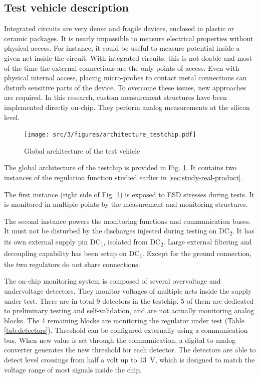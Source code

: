 \subsection{Test vehicle description}
\label{sec:test-vehicle-desc}

Integrated circuits are very dense and fragile devices, enclosed in plastic or ceramic packages.
It is nearly impossible to measure electrical properties without physical access.
For instance, it could be useful to measure potential inside a given net inside the circuit.
With integrated circuits, this is not doable and most of the time the external connections are the only points of access.
Even with physical internal access, placing micro-probes to contact metal connections can disturb sensitive parts of the device.
To overcome these issues, new approaches are required.
In this research, custom measurement structures have been implemented directly on-chip.
They perform analog measurements at the silicon level.

\begin{figure}[h]
  \centering
  \texttt{[image: src/3/figures/architecture\_testchip.pdf]}
  \caption{Global architecture of the test vehicle}
  \label{architecture_testchip}
\end{figure}

The global architecture of the testchip is provided in Fig. \ref{architecture_testchip}.
It contains two instances of the regulation function studied earlier in \ref{sec:study-real-product}.

The first instance (right side of Fig. \ref{architecture_testchip}) is exposed to \gls{ESD} stresses during tests.
It is monitored in multiple points by the measurement and monitoring structures.

The second instance powers the monitoring functions and communication buses.
It must not be disturbed by the discharges injected during testing on DC\textsubscript{2}.
It has its own external supply pin DC\textsubscript{1}, isolated from DC\textsubscript{2}.
Large external filtering and decoupling capability has been setup on DC\textsubscript{1}.
Except for the ground connection, the two regulators do not share connections.

The on-chip monitoring system is composed of several overvoltage and undervoltage detectors.
They monitor voltages of multiple nets inside the supply under test.
There are in total 9 detectors in the testchip.
5 of them are dedicated to preliminary testing and self-validation, and are not actually monitoring analog blocks.
The 4 remaining blocks are monitoring the regulator under test (Table \ref{tab:detectors}).
Threshold can be configured externally using a communication bus.
When new value is set through the communication, a digital to analog converter generates the new threshold for each detector.
The detectors are able to detect level crossings from half a volt up to \SI{13}{\volt}, which is designed to match the voltage range of most signals inside the chip.

